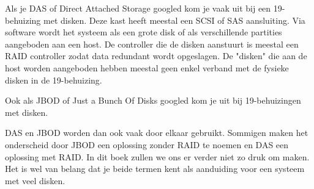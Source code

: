Als je DAS of Direct Attached Storage googled kom je vaak uit bij een 19\inch-behuizing met disken. Deze kast heeft meestal een SCSI of SAS aansluiting. Via software wordt het systeem als een grote disk of als verschillende partities aangeboden aan een host. De controller die de disken aanstuurt is meestal een RAID controller zodat data redundant wordt opgeslagen. De "disken" die aan de host worden aangeboden hebben meestal geen enkel verband met de fysieke disken in de 19\inch-behuizing.

Ook als JBOD of Just a Bunch Of Disks googled kom je uit bij 19\inch-behuizingen met disken.

DAS en JBOD worden dan ook vaak door elkaar gebruikt. Sommigen maken het onderscheid door JBOD een oplossing zonder RAID te noemen en DAS een oplossing met RAID. In dit boek zullen we ons er verder niet zo druk om maken. Het is wel van belang dat je beide termen kent als aanduiding voor een systeem met veel disken.
